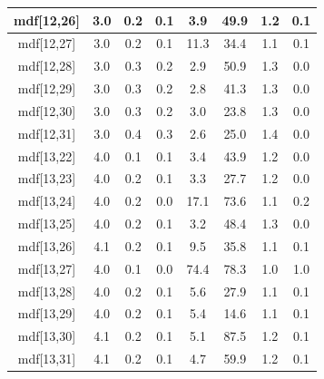 \begin{longtable}{|c|c|c|c|c|c|c|c|}
mdf[12,26] & 3.0 & 0.2 & 0.1 & 3.9 & 49.9 & 1.2 & 0.1 \\
\hline
mdf[12,27] & 3.0 & 0.2 & 0.1 & 11.3 & 34.4 & 1.1 & 0.1 \\
\hline
mdf[12,28] & 3.0 & 0.3 & 0.2 & 2.9 & 50.9 & 1.3 & 0.0 \\
\hline
mdf[12,29] & 3.0 & 0.3 & 0.2 & 2.8 & 41.3 & 1.3 & 0.0 \\
\hline
mdf[12,30] & 3.0 & 0.3 & 0.2 & 3.0 & 23.8 & 1.3 & 0.0 \\
\hline
mdf[12,31] & 3.0 & 0.4 & 0.3 & 2.6 & 25.0 & 1.4 & 0.0 \\
\hline
mdf[13,22] & 4.0 & 0.1 & 0.1 & 3.4 & 43.9 & 1.2 & 0.0 \\
\hline
mdf[13,23] & 4.0 & 0.2 & 0.1 & 3.3 & 27.7 & 1.2 & 0.0 \\
\hline
mdf[13,24] & 4.0 & 0.2 & 0.0 & 17.1 & 73.6 & 1.1 & 0.2 \\
\hline
mdf[13,25] & 4.0 & 0.2 & 0.1 & 3.2 & 48.4 & 1.3 & 0.0 \\
\hline
mdf[13,26] & 4.1 & 0.2 & 0.1 & 9.5 & 35.8 & 1.1 & 0.1 \\
\hline
mdf[13,27] & 4.0 & 0.1 & 0.0 & 74.4 & 78.3 & 1.0 & 1.0 \\
\hline
mdf[13,28] & 4.0 & 0.2 & 0.1 & 5.6 & 27.9 & 1.1 & 0.1 \\
\hline
mdf[13,29] & 4.0 & 0.2 & 0.1 & 5.4 & 14.6 & 1.1 & 0.1 \\
\hline
mdf[13,30] & 4.1 & 0.2 & 0.1 & 5.1 & 87.5 & 1.2 & 0.1 \\
\hline
mdf[13,31] & 4.1 & 0.2 & 0.1 & 4.7 & 59.9 & 1.2 & 0.1 \\
\hline
\end{longtable}
